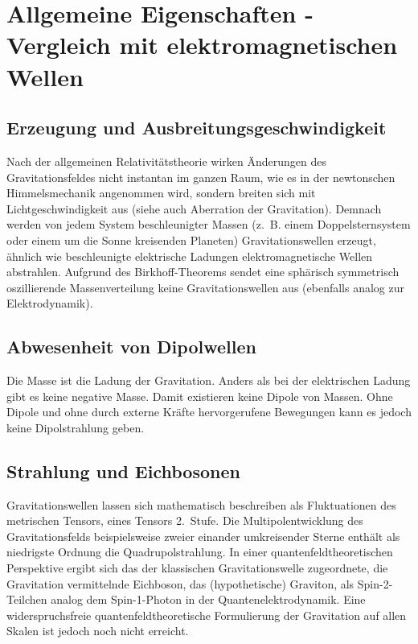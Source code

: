 
\chapter{Allgemeine Eigenschaften - Vergleich mit elektromagnetischen Wellen}
\label{chapter-basics}
\section{Erzeugung und Ausbreitungsgeschwindigkeit}
Nach der allgemeinen Relativitätstheorie wirken Änderungen des Gravitationsfeldes nicht instantan im ganzen Raum, wie es in der newtonschen Himmelsmechanik angenommen wird, sondern breiten sich mit Lichtgeschwindigkeit aus (siehe auch Aberration der Gravitation). Demnach werden von jedem System beschleunigter Massen (z. B. einem Doppelsternsystem oder einem um die Sonne kreisenden Planeten) Gravitationswellen erzeugt, ähnlich wie beschleunigte elektrische Ladungen elektromagnetische Wellen abstrahlen. Aufgrund des Birkhoff-Theorems sendet eine sphärisch symmetrisch oszillierende Massenverteilung keine Gravitationswellen aus (ebenfalls analog zur Elektrodynamik).

\section{Abwesenheit von Dipolwellen}
Die Masse ist die Ladung der Gravitation. Anders als bei der elektrischen Ladung gibt es keine negative Masse. Damit existieren keine Dipole von Massen. Ohne Dipole und ohne durch externe Kräfte hervorgerufene Bewegungen kann es jedoch keine Dipolstrahlung geben.


\section{Strahlung und Eichbosonen}
Gravitationswellen lassen sich mathematisch beschreiben als Fluktuationen des metrischen Tensors, eines Tensors 2. Stufe. Die Multipolentwicklung des Gravitationsfelds beispielsweise zweier einander umkreisender Sterne enthält als niedrigste Ordnung die Quadrupolstrahlung.
In einer quantenfeldtheoretischen Perspektive ergibt sich das der klassischen Gravitationswelle zugeordnete, die Gravitation vermittelnde Eichboson, das (hypothetische) Graviton, als Spin-2-Teilchen analog dem Spin-1-Photon in der Quantenelektrodynamik. Eine widerspruchsfreie quantenfeldtheoretische Formulierung der Gravitation auf allen Skalen ist jedoch noch nicht erreicht.

